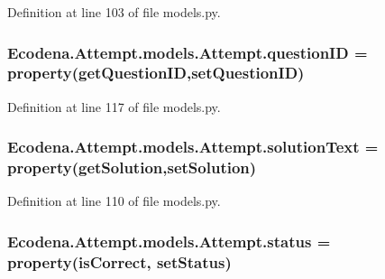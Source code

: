 Definition at line 103 of file models.py.

\hypertarget{class_ecodena_1_1_attempt_1_1models_1_1_attempt_af6d21b0d06e1565c641f9526ab4891d4}{
\subsubsection[{questionID}]{\setlength{\rightskip}{0pt plus 5cm}Ecodena.Attempt.models.Attempt.questionID = property(getQuestionID,setQuestionID)}}
\label{d5/da0/class_ecodena_1_1_attempt_1_1models_1_1_attempt_af6d21b0d06e1565c641f9526ab4891d4}


Definition at line 117 of file models.py.

\hypertarget{class_ecodena_1_1_attempt_1_1models_1_1_attempt_a0ef6767e7f18226ecd46be45e35f357b}{
\subsubsection[{solutionText}]{\setlength{\rightskip}{0pt plus 5cm}Ecodena.Attempt.models.Attempt.solutionText = property(getSolution,setSolution)}}
\label{d5/da0/class_ecodena_1_1_attempt_1_1models_1_1_attempt_a0ef6767e7f18226ecd46be45e35f357b}


Definition at line 110 of file models.py.

\hypertarget{class_ecodena_1_1_attempt_1_1models_1_1_attempt_a1110fd10d7a9e73bae4c5f4208f24d9b}{
\subsubsection[{status}]{\setlength{\rightskip}{0pt plus 5cm}Ecodena.Attempt.models.Attempt.status = property(isCorrect, setStatus)}}
\label{d5/da0/class_ecodena_1_1_attempt_1_1models_1_1_attempt_a1110fd10d7a9e73bae4c5f4208f24d9b}



